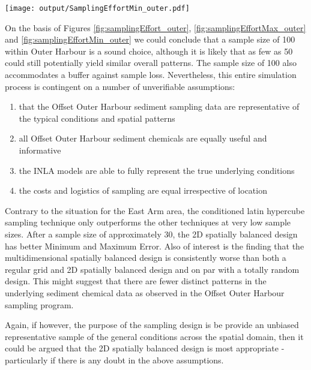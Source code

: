 \documentclass[a4paper]{article}
\let\origfigure=\figure
\let\endorigfigure=\endfigure
\renewenvironment{figure}[1][]{%
   \origfigure[H]
}{%
   \endorigfigure
}
\begin{document}
\begin{figure}
\centering\scriptsize
\texttt{[image: output/SamplingEffortMin\_outer.pdf]}
\caption{Comparison of the minimum Error conditional on sample size and
sampling method for the Outer
Harbour\label{fig:samplingEffortMin_outer}}
\end{figure}

On the basis of Figures \ref{fig:samplingEffort_outer},
\ref{fig:samplingEffortMax_outer} and \ref{fig:samplingEffortMin_outer}
we could conclude that a sample size of 100 within Outer Harbour is a
sound choice, although it is likely that as few as 50 could still
potentially yield similar overall patterns. The sample size of 100 also
accommodates a buffer against sample loss. Nevertheless, this entire
simulation process is contingent on a number of unverifiable
assumptions:

\begin{enumerate}
\def\labelenumi{\arabic{enumi}.}
\tightlist
\item
  that the Offset Outer Harbour sediment sampling data are
  representative of the typical conditions and spatial patterns
\item
  all Offset Outer Harbour sediment chemicals are equally useful and
  informative
\item
  the INLA models are able to fully represent the true underlying
  conditions
\item
  the costs and logistics of sampling are equal irrespective of location
\end{enumerate}

Contrary to the situation for the East Arm area, the conditioned latin
hypercube sampling technique only outperforms the other techniques at
very low sample sizes. After a sample size of approximately 30, the 2D
spatially balanced design has better Minimum and Maximum Error. Also of
interest is the finding that the multidimensional spatially balanced
design is consistently worse than both a regular grid and 2D spatially
balanced design and on par with a totally random design. This might
suggest that there are fewer distinct patterns in the underlying
sediment chemical data as observed in the Offset Outer Harbour sampling
program.

Again, if however, the purpose of the sampling design is be provide an
unbiased representative sample of the general conditions across the
spatial domain, then it could be argued that the 2D spatially balanced
design is most appropriate - particularly if there is any doubt in the
above assumptions.
\end{document}
